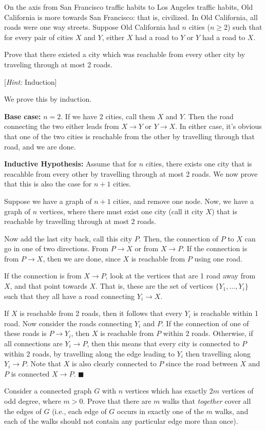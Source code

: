 \documentclass[11pt]{article}
\begin{document}
\begin{Parts}

\Part On the axis from San Francisco traffic habits to Los Angeles traffic habits, Old California is more towards San Francisco: that is, civilized. In Old California, all roads were one way streets. Suppose Old California had 
$n$ cities ($n \geq 2$) such that for every pair of cities $X$ and $Y$,
either $X$ had a road to $Y$ or $Y$ had a road to $X$.

Prove that there existed a city which was reachable from every other city by traveling through at most 2 roads. 

[\textit{Hint:} Induction]

\begin{solution}
    We prove this by induction. 

    \textbf{Base case:} $n = 2$. If we have 2 cities, call them $X$ and $Y$. Then the road connecting the two either leads from $X \to Y$ or $Y \to X$. In either case, it's obvious that one of the two cities is reachable from the other by travelling through that road, and we are done. 


    \textbf{Inductive Hypothesis:} Assume that for $n$ cities, there exists one city that is reacahble from every other by travelling through at most 2 roads. We now prove that this is also the case for $n+1$ cities. 
    
    Suppose we have a graph of $n+1$ cities, and remove one node. Now, we have a graph of $n$ vertices, where there must exist one city (call it city $X$) that is reachable by travelling through at most 2 roads. 

    Now add the last city back, call this city $P$. Then, the connection of $P$ to $X$ can go in one of two directions. From $P \to X$ or from $X \to P$. If the connection is from $P \to X$, then we are done, since $X$ is reachable from $P$ using one road. 

    If the connection is from $X \to P$, look at the vertices that are 1 road away from $X$, and that point towards $X$. That is, these are the set of vertices $\{Y_1, \dots, Y_i\}$ such that they all have a road connecting $Y_i \to X$.
    
    If $X$ is reachable from 2 roads, then it follows that every $Y_i$ is reachable within 1 road. Now consider the roads connecting $Y_i$ and $P$. If the connection of one of these roads is $P \to Y_i$, then $X$ is reachable from $P$ within 2 roads. Otherwise, if all connections are $Y_i \to P$, then this means that every city is connected to $P$ within 2 roads, by travelling along the edge leading to $Y_i$ then travelling along $Y_i \to P$. Note that $X$ is also clearly connected to $P$ since the road between $X$ and $P$ is connected $X \to P$. $\blacksquare$
\end{solution}
\Part Consider a connected graph $G$ with $n$ vertices which has exactly $2m$ vertices of
odd degree, where $m > 0$. Prove that there are $m$ walks that \emph{together} 
cover all the edges of $G$ (i.e., each edge of $G$ occurs in exactly one of the $m$ walks, 
and each of the walks should not contain any particular edge more than once).


\end{Parts}
\end{document}

